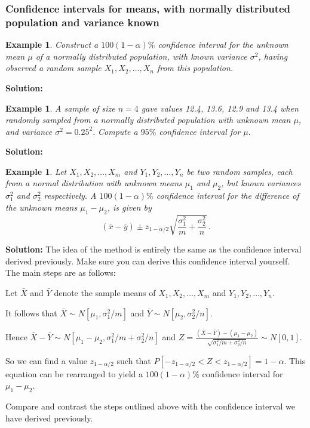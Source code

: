 \documentclass[12pt]{article}
\theoremstyle{break}
\newtheorem{example}[theorem]{Example}
\begin{document}
\subsubsection{Confidence intervals for means, with normally distributed population and variance known}
\begin{example}
Construct a $100(1-\alpha)\%$ confidence interval for the unknown mean $\mu$ of a normally distributed population, with known variance $\sigma^{2}$, having observed a random sample $X_{1},X_{2},\ldots, X_{n}$ from this population.
\end{example}
\begin{mdframed}
{\bf Solution:}
\textcolor[rgb]{1.00,1.00,1.00}{\lipsum[1-8]}
\end{mdframed}

\begin{example}
A sample of size $n=4$ gave values 12.4, 13.6, 12.9 and 13.4 when randomly sampled from a normally distributed population with unknown mean $\mu$, and variance $\sigma^{2}=0.25^2.$ Compute a $95\%$ confidence interval for $\mu.$
\end{example}

\begin{mdframed}
{\bf Solution:}
\textcolor[rgb]{1.00,1.00,1.00}{\lipsum[1-3]}
\end{mdframed}



\begin{example}
Let $X_{1},X_{2},\ldots, X_{m}$ and $Y_{1},Y_{2},\ldots,Y_{n}$ be two random samples, each from a normal distribution with unknown means $\mu_{1}$ and $\mu_{2}$, but known variances $\sigma_{1}^{2}$ and $\sigma_{2}^{2}$ respectively. A $100(1-\alpha)\%$ confidence interval for the difference of the unknown means $\mu_{1}-\mu_{2}$, is given by $$(\bar{x}-\bar{y})\pm z_{1-\alpha/2}\sqrt{\frac{\sigma_{1}^{2}}{m}+\frac{\sigma_{2}^{2}}{n}}\, .$$
\end{example}
\begin{mdframed}
{\bf Solution:}
The idea of the method is entirely the same as the confidence interval derived previously. Make sure you can derive this confidence interval yourself. The main steps are as follows:

Let $\bar{X}$ and $\bar{Y}$ denote the sample means of $X_{1},X_{2},\ldots, X_{m}$ and $Y_{1},Y_{2},\ldots,Y_{n}$.

It follows that $\bar{X}\sim N\left[\mu_{1},\sigma_{1}^{2}/m\right]$ and $\bar{Y}\sim N\left[\mu_{2},\sigma_{2}^{2}/n\right].$

Hence $\bar{X}-\bar{Y}\sim N\left[\mu_{1}-\mu_{2},\sigma_{1}^{2}/m+\sigma_{2}^{2}/n\right]$ and $ \displaystyle Z=\frac{(\bar{X}-\bar{Y})-(\mu_{1}-\mu_{2})}{\sqrt{\sigma_{1}^{2}/m+\sigma_{2}^{2}/n}}\sim N\left[0,1\right].$

So we can find a value $z_{1-\alpha/2}$ such that $P[-z_{1-\alpha/2}<Z<z_{1-\alpha/2}]=1-\alpha.$ This equation can be rearranged to yield a $100(1-\alpha)\%$ confidence interval for $\mu_{1}-\mu_{2}$.

Compare and contrast the steps outlined above with the confidence interval we have derived previously.
\end{mdframed}
\end{document}
